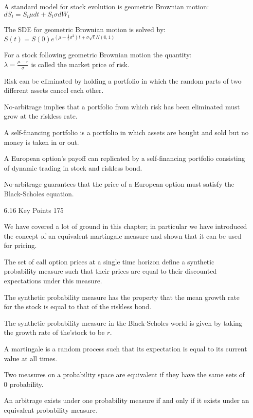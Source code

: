 A standard model for stock evolution is geometric Brownian motion: \\
$dS_t = S_t \mu dt + S_t \sigma dW_t$

The SDE for geometric Brownian motion is solved by: \\
$S(t) = S(0) e^{\left( \mu-\frac{1}{2}\sigma^2 \right)t+\sigma \sqrt{t} N(0,1)}$

For a stock following geometric Brownian motion the quantity: \\
$\lambda = \frac{\mu - r}{\sigma}$ is called the market price of risk.

Risk can be eliminated by holding a portfolio in which the random parts of two different assets cancel each other.

No-arbitrage implies that a portfolio from which risk has been eliminated must grow at the riskless rate.

A self-financing portfolio is a portfolio in which assets are bought and sold but no money is taken in or out.

A European option's payoff can replicated by a self-financing portfolio consisting of dynamic trading in stock and riskless bond.

No-arbitrage guarantees that the price of a European option must satisfy the Black-Scholes equation.

6.16 Key Points 175

We have covered a lot of ground in this chapter; in particular we have introduced the concept of an equivalent martingale measure and shown that it can be used for pricing.

The set of call option prices at a single time horizon define a synthetic probability measure such that their prices are equal to their discounted expectations under this measure.

The synthetic probability measure has the property that the mean growth rate for the stock is equal to that of the riskless bond.

The synthetic probability measure in the Black-Scholes world is given by taking the growth rate of the'stock to be $r$.

A martingale is a random process such that its expectation is equal to its current value at all times.

Two measures on a probability space are equivalent if they have the same sets of $0$ probability.

An arbitrage exists under one probability measure if and only if it exists under an equivalent probability measure.

